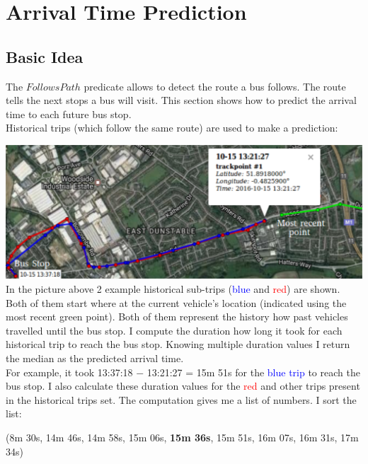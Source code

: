 \documentclass[12pt,a4paper,oneside,openright]{report}
\begin{document}
\newpage

\section{Arrival Time Prediction}

\subsection{Basic Idea}

The $FollowsPath$ predicate allows to detect the route a bus follows.
The route tells the next stops a bus will visit. This section shows how to
predict the arrival time to each future bus stop. \\

Historical trips (which follow the same route) are used to make a prediction:

\includegraphics[width=\textwidth]{figs/future_stop.png} \\

In the picture above 2 example historical sub-trips (\textcolor{blue}{blue}
and \textcolor{red}{red}) are shown.
Both of them start where at the current vehicle's location (indicated
using the most recent green point). Both of them represent the history how past
vehicles travelled until the bus stop. I compute the duration how long it
took for each historical trip to reach the bus stop. Knowing multiple duration values
I return the median as the predicted arrival time. \\

For example, it took 13:37:18 $-$ 13:21:27 = 15m 51s for the
\textcolor{blue}{blue trip} to reach the bus stop. I also calculate these
duration values for the \textcolor{red}{red} and other trips present in the
historical trips set. The computation gives me a list of numbers.
I sort the list:

\:
\:

(8m 30s, 14m 46s, 14m 58s, 15m 06s, \textbf{15m 36s}, 15m 51s, 16m 07s, 16m 31s,
 17m 34s)
\end{document}
